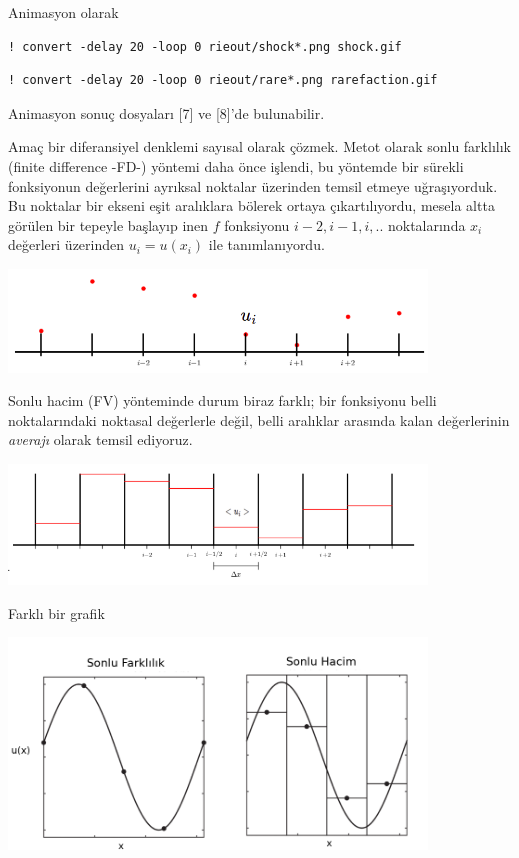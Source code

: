 \documentclass[12pt,fleqn]{article}\usepackage{../../common}
\begin{document}
Animasyon olarak

\begin{verbatim}
! convert -delay 20 -loop 0 rieout/shock*.png shock.gif
\end{verbatim}

\begin{verbatim}
! convert -delay 20 -loop 0 rieout/rare*.png rarefaction.gif
\end{verbatim}

Animasyon sonuç dosyaları [7] ve [8]'de bulunabilir.

Amaç bir diferansiyel denklemi sayısal olarak çözmek. Metot olarak sonlu
farklılık (finite difference -FD-) yöntemi daha önce işlendi, bu yöntemde bir
sürekli fonksiyonun değerlerini ayrıksal noktalar üzerinden temsil etmeye
uğraşıyorduk.  Bu noktalar bir ekseni eşit aralıklara bölerek ortaya
çıkartılıyordu, mesela altta görülen bir tepeyle başlayıp inen $f$ fonksiyonu
$i-2,i-1,i,..$ noktalarında $x_i$ değerleri üzerinden $u_i = u(x_i)$ ile
tanımlanıyordu.

\includegraphics[width=30em]{13-22-29.png}

Sonlu hacim (FV) yönteminde durum biraz farklı; bir fonksiyonu belli
noktalarındaki noktasal değerlerle değil, belli aralıklar arasında kalan
değerlerinin {\em averajı} olarak temsil ediyoruz.

\includegraphics[width=30em]{13-22-34.png}

Farklı bir grafik

\includegraphics[width=30em]{13-16-00.png}
\end{document}
